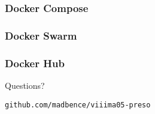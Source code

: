 \documentclass[xetex,mathserif,serif]{beamer}
\begin{document}
  \begin{frame}
    \frametitle{Docker Compose}
  \end{frame}
  \begin{frame}
    \frametitle{Docker Swarm}
  \end{frame}
  \begin{frame}
    \frametitle{Docker Hub}
  \end{frame}
  \begin{frame}[c,plain]
    \begin{center}
      {\Huge Questions?}

      \vspace{1cm}

      \texttt{github.com/madbence/viiima05-preso}
    \end{center}
  \end{frame}
\end{document}
